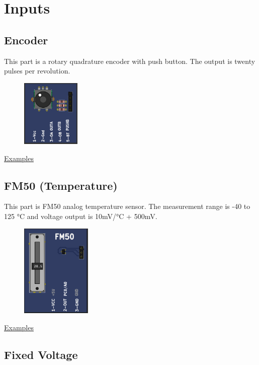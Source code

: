 \section{Inputs}
\subsection{Encoder}

This part is a rotary quadrature encoder with push button. The output is twenty pulses per revolution.

\begin{figure}[H]
\center
\includegraphics[width=0.25\textwidth]{img/part_encoder.png} 
\end{figure} 

\href{https://lcgamboa.github.io/picsimlab_examples/Parts.html\#Encoder}{Examples}
 
\subsection{FM50 (Temperature)}

This part is FM50 analog temperature sensor. The measurement range is -40 to 125 °C  and 
voltage output is 10mV/°C + 500mV.

\begin{figure}[H]
\center
\includegraphics[width=0.3\textwidth]{img/part_fm50.png} 
\end{figure} 


\href{https://lcgamboa.github.io/picsimlab_examples/Parts.html\#FM50_(Temperature)}{Examples}

\subsection{Fixed Voltage}

